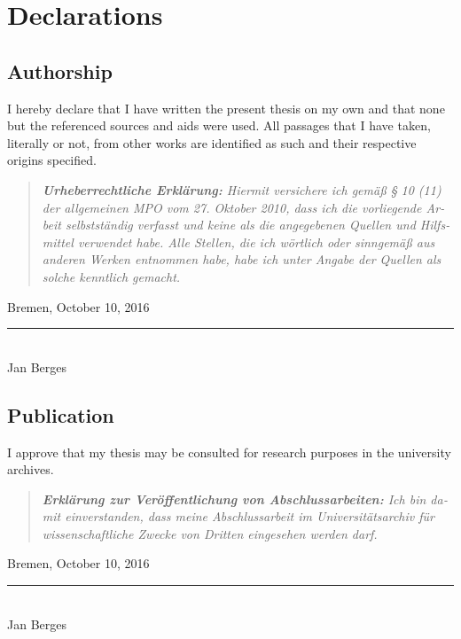 

\chapter{Declarations}

\section*{Authorship}

I hereby declare that I have written the present thesis on my own and that none
but the referenced sources and aids were used. All passages that I have taken,
literally or not, from other works are identified as such and their respective
origins specified.

\begin{otherlanguage}{ngerman}
    \begin{quote}
        \small \itshape
        \textbf{Urheberrechtliche Erklärung:}
        Hiermit versichere ich gemäß § 10 (11) der allgemeinen MPO vom 27.
        Oktober 2010, dass ich die vorliegende Arbeit selbstständig verfasst und
        keine als die angegebenen Quellen und Hilfsmittel verwendet habe.
        Alle Stellen, die ich wörtlich oder sinngemäß aus anderen Werken
        entnommen habe, habe ich unter Angabe der Quellen als solche kenntlich
        gemacht.
    \end{quote}
\end{otherlanguage}

Bremen, October 10, 2016

\begin{flushright}
    \rule{3cm}{0.5pt} \\
    Jan Berges \\
\end{flushright}

\section*{Publication}

I approve that my thesis may be consulted for research purposes in the
university archives.

\begin{otherlanguage}{ngerman}
    \begin{quote}
        \small \itshape
        \textbf{Erklärung zur Veröffentlichung von Abschlussarbeiten:}
        Ich bin damit einverstanden, dass meine Abschlussarbeit im
        Universitätsarchiv für wissenschaftliche Zwecke von Dritten eingesehen
        werden darf.
    \end{quote}
\end{otherlanguage}

Bremen, October 10, 2016

\begin{flushright}
    \rule{3cm}{0.5pt} \\
    Jan Berges
\end{flushright}
